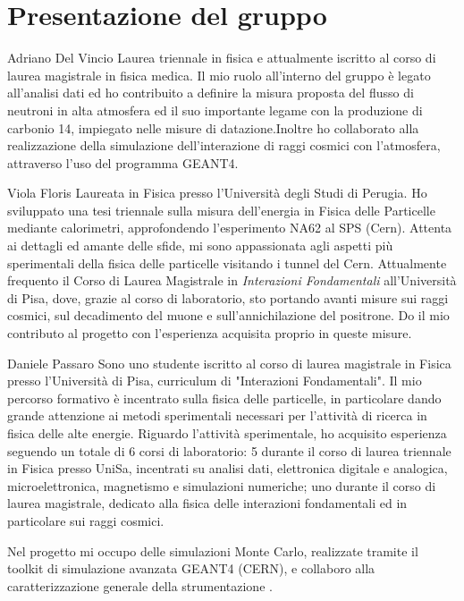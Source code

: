 
\section*{Presentazione del gruppo}

\begin{crewbio}{Adriano Del Vincio}
Laurea triennale in fisica e attualmente iscritto al corso di laurea magistrale in fisica medica. Il mio ruolo all'interno del gruppo è legato all'analisi dati ed ho contribuito a definire la misura proposta del flusso di neutroni in alta atmosfera ed il suo importante legame con la produzione di carbonio 14, impiegato nelle misure di datazione.Inoltre ho collaborato alla realizzazione della simulazione dell'interazione di raggi cosmici con l'atmosfera, attraverso l'uso del programma GEANT4. 
\end{crewbio}

\begin{crewbio}{Viola Floris}
Laureata in Fisica presso l'Università degli Studi di Perugia. Ho sviluppato una tesi triennale sulla misura dell'energia in Fisica delle Particelle mediante calorimetri, approfondendo l'esperimento NA62 al SPS (Cern). Attenta ai dettagli ed amante delle sfide, mi sono appassionata agli aspetti più sperimentali della fisica delle particelle visitando i tunnel del Cern. Attualmente frequento il Corso di Laurea Magistrale in \emph{Interazioni Fondamentali} all'Università di Pisa, dove, grazie al corso di laboratorio, sto portando avanti misure sui raggi cosmici, sul decadimento del muone e sull'annichilazione del positrone. Do il mio contributo al progetto con l'esperienza acquisita proprio in queste misure.
\end{crewbio}

\begin{crewbio}{Daniele Passaro}
Sono uno studente iscritto al corso di laurea magistrale in Fisica presso l'Università di Pisa, curriculum di  "Interazioni Fondamentali". 
Il mio percorso formativo è incentrato sulla fisica delle particelle, in particolare dando grande attenzione ai metodi sperimentali necessari per l'attività di ricerca in fisica delle alte energie. Riguardo l'attività sperimentale, ho acquisito esperienza seguendo un totale di 6 corsi di laboratorio: 5 durante il corso di laurea triennale in Fisica presso UniSa, incentrati su analisi dati, elettronica digitale e analogica, microelettronica, magnetismo e simulazioni numeriche; uno durante il corso di laurea magistrale, dedicato alla fisica delle interazioni fondamentali ed in particolare sui raggi cosmici.

Nel progetto mi occupo delle simulazioni Monte Carlo, realizzate tramite il toolkit di simulazione avanzata GEANT4 (\textcopyright CERN), e collaboro alla caratterizzazione generale della strumentazione . 
\end{crewbio}

